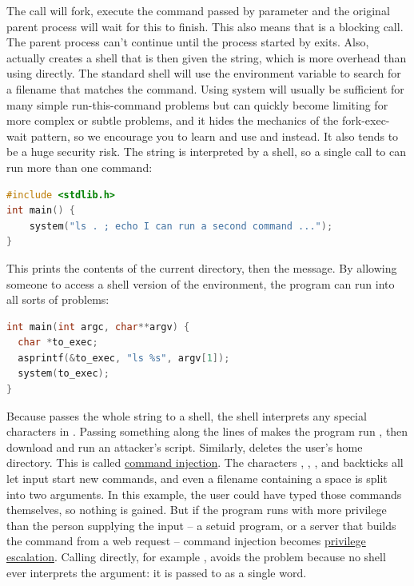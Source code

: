 The  call will fork, execute the command passed by parameter and the original parent process will wait for this to finish.
This also means that  is a blocking call.
The parent process can't continue until the process started by  exits.
Also,  actually creates a shell that is then given the string, which is more overhead than using  directly.
The standard shell will use the  environment variable to search for a filename that matches the command.
Using system will usually be sufficient for many simple run-this-command problems but can quickly become limiting for more complex or subtle problems, and it hides the mechanics of the fork-exec-wait pattern, so we encourage you to learn and use   and  instead.
It also tends to be a huge security risk.
The string is interpreted by a shell, so a single call to  can run more than one command:

\begin{lstlisting}[language=C]
#include <stdlib.h>
int main() {
    system("ls . ; echo I can run a second command ...");
}
\end{lstlisting}

This prints the contents of the current directory, then the message.
By allowing someone to access a shell version of the environment, the program can run into all sorts of problems:

\begin{lstlisting}[language=C]
int main(int argc, char**argv) {
  char *to_exec;
  asprintf(&to_exec, "ls %s", argv[1]);
  system(to_exec);
}
\end{lstlisting}

Because  passes the whole string to a shell, the shell interprets any special characters in .
Passing something along the lines of  makes the program run , then download and run an attacker's script.
Similarly,  deletes the user's home directory.
This is called \href{https://en.wikipedia.org/wiki/Code\_injection\#Shell\_injection}{command injection}.
The characters \keyword{;}, \keyword{|}, \keyword{\&\&},  and backticks all let input start new commands, and even a filename containing a space is split into two arguments.
In this example, the user could have typed those commands themselves, so nothing is gained.
But if the program runs with more privilege than the person supplying the input -- a setuid program, or a server that builds the command from a web request -- command injection becomes \href{https://en.wikipedia.org/wiki/Privilege\_escalation}{privilege escalation}.
Calling  directly, for example , avoids the problem because no shell ever interprets the argument: it is passed to  as a single word.

